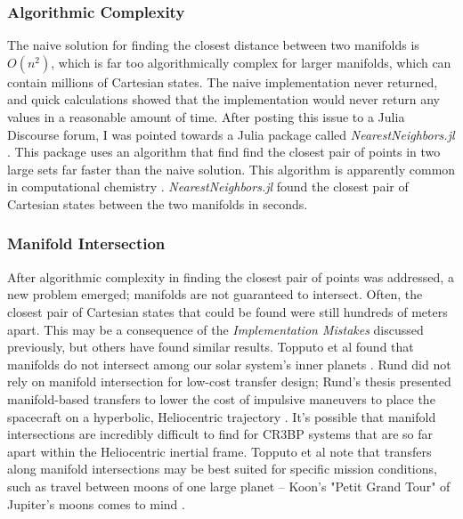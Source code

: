 \documentclass[conf]{new-aiaa}
\begin{document}
\begin{multicols}{2}
\subsubsection*{Algorithmic Complexity}
The naive solution for finding the closest distance between two 
manifolds is $O(n^2)$, which is far too algorithmically complex 
for larger manifolds, which can contain millions of Cartesian states.
The naive implementation never returned, and quick calculations showed
that the implementation would never return any values in a reasonable
amount of time. After posting this issue to a Julia Discourse forum,
I was pointed towards a Julia package called \textit{NearestNeighbors.jl}
\cite{discourse2021} \cite{nearestNeighbors}. This package uses an 
algorithm that find find the closest pair of points in two 
large sets far faster than the naive solution. This algorithm
is apparently common in computational chemistry \cite{discourse2021}.
\textit{NearestNeighbors.jl} found the closest pair of Cartesian
states between the two manifolds in seconds. 

\subsubsection*{Manifold Intersection}
After algorithmic complexity in finding the closest pair of points was 
addressed, a new problem emerged; manifolds are not guaranteed to intersect. 
Often, the closest pair of Cartesian states that could be found were still 
hundreds of meters apart. This may be a consequence of the \textit{Implementation
Mistakes} discussed previously, but others have found similar results. 
Topputo et al found that manifolds do not intersect among our solar system's
inner planets \cite{topputo2005low}. Rund did not rely on manifold 
intersection for low-cost transfer design; Rund's thesis presented 
manifold-based transfers to lower the cost of impulsive maneuvers
to place the spacecraft on a hyperbolic, Heliocentric trajectory 
\cite{rund2018interplanetary}. It's possible that manifold intersections
are incredibly difficult to find for CR3BP systems that are so far 
apart within the Heliocentric inertial frame. Topputo et al note
that transfers along manifold intersections may be best suited for specific 
mission conditions, such as travel between moons of one large planet --
Koon's "Petit Grand Tour" of Jupiter's moons comes to mind 
\cite{topputo2005low} \cite{koon2008dynamical}.


\end{multicols}
\end{document}
